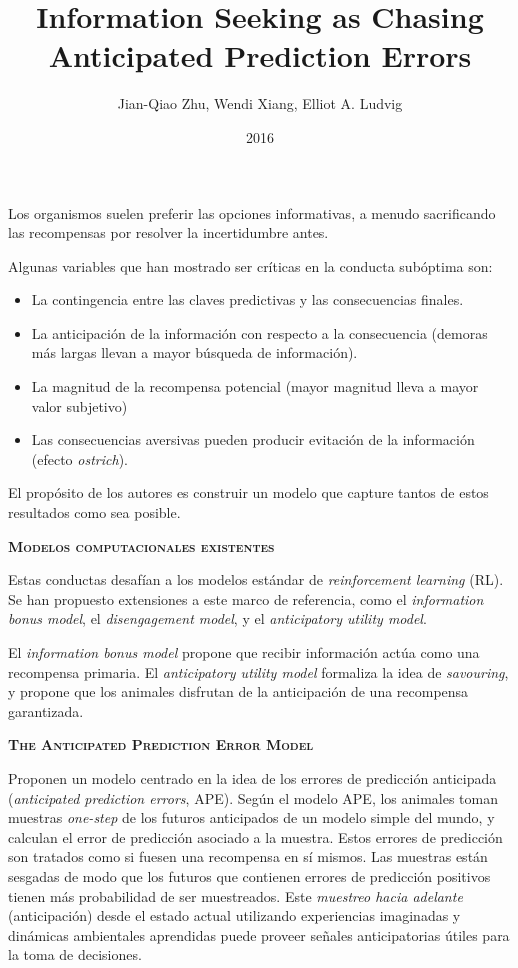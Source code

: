 \documentclass[a4paper,12pt]{article}
\title{Information Seeking as Chasing Anticipated Prediction Errors}
\author{Jian-Qiao Zhu, Wendi Xiang, Elliot A. Ludvig}
\date{2016}
\begin{document}
{\scshape\bfseries \maketitle}

Los organismos suelen preferir las opciones informativas, a menudo sacrificando las recompensas por resolver la incertidumbre antes. 

Algunas variables que han mostrado ser críticas en la conducta subóptima son:
\begin{itemize}
	\item La contingencia entre las claves predictivas y las consecuencias finales.
	\item La anticipación de la información con respecto a la consecuencia (demoras más largas llevan a mayor búsqueda de información).
	\item La magnitud de la recompensa potencial (mayor magnitud lleva a mayor valor subjetivo)
	\item Las consecuencias aversivas pueden producir evitación de la información (efecto {\itshape ostrich}).
\end{itemize}

El propósito de los autores es construir un modelo que capture tantos de estos resultados como sea posible.

{\scshape\bfseries Modelos computacionales existentes}

Estas conductas desafían a los modelos estándar de {\itshape reinforcement learning} (RL). Se han propuesto extensiones a este marco de referencia, como el {\itshape information bonus model}, el {\itshape disengagement model}, y el {\itshape anticipatory utility model}.

El {\itshape information bonus model} propone que recibir información actúa como una recompensa primaria. El {\itshape anticipatory utility model} formaliza la idea de {\slshape savouring}, y propone que los animales disfrutan de la anticipación de una recompensa garantizada.

{\scshape\bfseries The Anticipated Prediction Error Model}

Proponen un modelo centrado en la idea de los errores de predicción anticipada ({\itshape anticipated prediction errors}, APE). Según el modelo APE, los animales toman muestras {\slshape one-step} de los futuros anticipados de un modelo simple del mundo, y calculan el error de predicción asociado a la muestra. Estos errores de predicción son tratados como si fuesen una recompensa en sí mismos. Las muestras están sesgadas de modo que los futuros que contienen errores de predicción positivos tienen más probabilidad de ser muestreados. Este {\slshape muestreo hacia adelante} (anticipación) desde el estado actual utilizando experiencias imaginadas y dinámicas ambientales aprendidas puede proveer señales anticipatorias útiles para la toma de decisiones.
\end{document}
